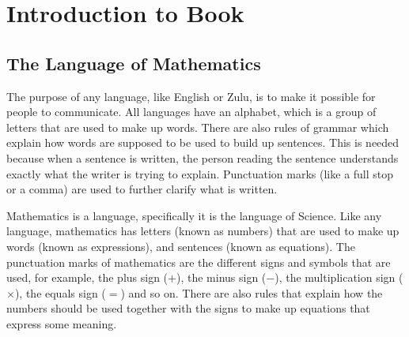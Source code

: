 \chapter{Introduction to Book}
\label{mathintro}

\section{The Language of Mathematics}
The purpose of any language, like English or Zulu, is to make it possible for people to communicate. All languages have an alphabet, which is a group of letters that are used to make up words. There are also rules of grammar which explain how words are supposed to be used to build up sentences. This is needed because when a sentence is written, the person reading the sentence understands exactly what the writer is trying to explain. Punctuation marks (like a full stop or a comma) are used to further clarify what is written.

Mathematics is a language, specifically it is the language of Science. Like any language, mathematics has letters (known as numbers) that are used to make up words (known as expressions), and sentences (known as equations). The punctuation marks of mathematics are the different signs and symbols that are used, for example, the plus sign ($+$), the minus sign ($-$), the multiplication sign ($\times$), the equals sign ($=$) and so on. There are also rules that explain how the numbers should be used together with the signs to make up equations that express some meaning.




